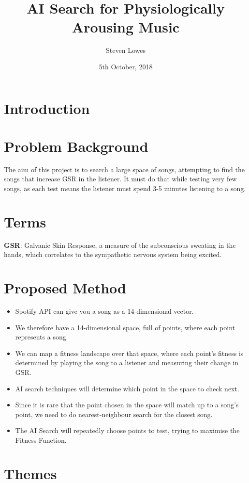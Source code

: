 \documentclass{article}
\title{AI Search for Physiologically Arousing Music}
\author{Steven Lowes}
\date{5th October, 2018}
\begin{document}
	\maketitle
	
	\section{Introduction}
	
	\section{Problem Background}
	The aim of this project is to search a large space of songs, attempting to find the songs that increase GSR in the listener. It must do that while testing very few songs, as each test means the listener must spend 3-5 minutes listening to a song. 
	
	\section{Terms}
	\textbf{GSR}: Galvanic Skin Response, a measure of the subconscious sweating in the hands, which correlates to the sympathetic nervous system being excited.
	
	
	\section{Proposed Method}
	\begin{itemize}
		\item Spotify API can give you a song as a 14-dimensional vector.
		\item We therefore have a 14-dimensional space, full of points, where each point represents a song
		\item We can map a fitness landscape over that space, where each point's fitness is determined by playing the song to a listener and measuring their change in GSR.
		\item AI search techniques will determine which point in the space to check next.
		\item Since it is rare that the point chosen in the space will match up to a song's point, we need to do nearest-neighbour search for the closest song.
		\item The AI Search will repeatedly choose points to test, trying to maximise the Fitness Function.
	\end{itemize}
	
	\section{Themes}
\end{document}
